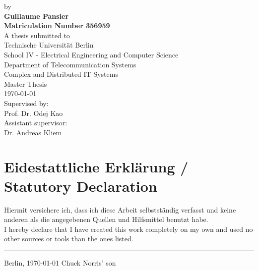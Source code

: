 \documentclass[twoside,11pt,titlepage,a4paper,english,bibliography=totocnumbered,listof=numbered]{scrbook}
\begin{document}
\begin{titlepage}
\begin{center}
\begin{spacing}{.9}
		\end{spacing}
		\vspace{0.8cm}
		\large
		by\\
		\vspace{0.8cm} 
		\textbf{Guillaume Pansier}\\
		\vspace{0.8cm} 
		\textbf{Matriculation Number 356959}\\
		\vspace{2cm} 
	 	A thesis submitted to\\
		\vspace{0.5cm}
		Technische Universität Berlin\\
		School IV - Electrical Engineering and Computer Science\\
		Department of Telecommunication Systems\\
		Complex and Distributed IT Systems\\
		\vspace{0.5cm}
		Master Thesis\\
		\vspace{2.2cm}
		\today\\
		\vspace{2.0cm}
		\large
		Supervised by:\\
		Prof. Dr. Odej Kao\\
		\vspace{1cm}
		Assistant supervisor:\\
		Dr. Andreas Kliem
		\end{center}
\end{titlepage}
\thispagestyle{empty}

\cleardoublepage

\newpage
\section*{\thispagestyle{empty}Eidestattliche Erklärung / Statutory Declaration}
Hiermit versichere ich, dass ich diese Arbeit selbst\-ständig verfasst und keine anderen als die angegebenen Quellen und Hilfsmittel benutzt habe. \\

\noindent I hereby declare that I have created this work completely on my own and used no other sources or tools than the ones listed.

\vspace{30 mm}
\begin{flushright}

\rule{90mm}{1pt}

Berlin, \today \hspace{15 mm} Chuck Norris' son
\end{flushright}
\clearpage
\end{document}
